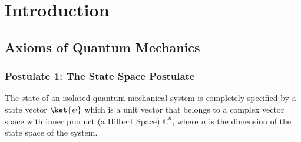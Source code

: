 \documentclass[12pt, oneside]{book}
\theoremstyle{definition}
\theoremstyle{definition}
\theoremstyle{remark}
\begin{document}

\mainmatter  %

\chapter{Introduction}
\section{Axioms of Quantum Mechanics}
\subsection{Postulate 1: The State Space Postulate}
The state of an isolated quantum mechanical system is completely specified by a state vector $\ket{\psi}$ 
which is a unit vector that belongs to a complex vector space with inner product (a Hilbert Space) $\mathbb{C}^{n}$, where $n$ is the 
dimension of the state space of the system. 
\end{document}
